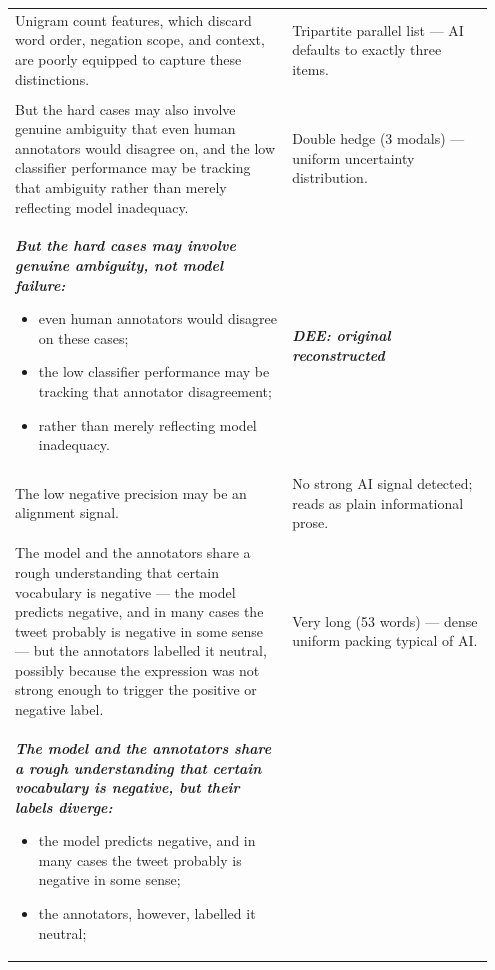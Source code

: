 \documentclass[11pt]{article}
\begin{document}
\begin{longtable}{|p{0.55\linewidth}|p{0.40\linewidth}|}
\hline
\rule{0pt}{3.5cm} & \\
\hline
Unigram count features, which discard word order, negation scope, and context, are poorly equipped to capture these distinctions. & Tripartite parallel list --- AI defaults to exactly three items. \\[2pt]
\hline
\rule{0pt}{3.5cm} & \\
\hline
But the hard cases may also involve genuine ambiguity that even human annotators would disagree on, and the low classifier performance may be tracking that ambiguity rather than merely reflecting model inadequacy. & Double hedge (3 modals) --- uniform uncertainty distribution. \\[2pt]
\hline
{\bfseries\itshape But the hard cases may involve genuine ambiguity, not model failure:
\begin{itemize}[leftmargin=*,topsep=2pt,itemsep=1pt,parsep=0pt]
  \item even human annotators would disagree on these cases;
  \item the low classifier performance may be tracking that annotator disagreement;
  \item rather than merely reflecting model inadequacy.\vspace{2em}
\end{itemize}} & \textbf{\textit{DEE: original reconstructed}} \\[2em]
\hline
The low negative precision may be an alignment signal. & No strong AI signal detected; reads as plain informational prose. \\[2pt]
\hline
\rule{0pt}{3.5cm} & \\
\hline
The model and the annotators share a rough understanding that certain vocabulary is negative --- the model predicts negative, and in many cases the tweet probably is negative in some sense --- but the annotators labelled it neutral, possibly because the expression was not strong enough to trigger the positive or negative label. & Very long (53 words) --- dense uniform packing typical of AI. \\[2pt]
\hline
{\bfseries\itshape The model and the annotators share a rough understanding that certain vocabulary is negative, but their labels diverge:
\begin{itemize}[leftmargin=*,topsep=2pt,itemsep=1pt,parsep=0pt]
  \item the model predicts negative, and in many cases the tweet probably is negative in some sense;
  \item the annotators, however, labelled it neutral;

\end{itemize}}
\end{longtable}
\end{document}
